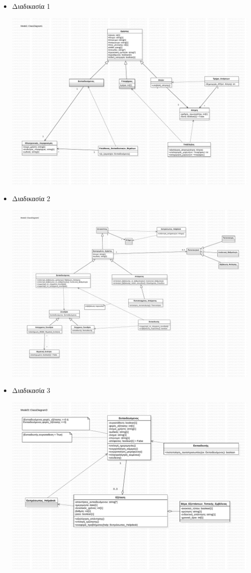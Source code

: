 \documentclass[a4paper, titlepage, twoside]{article}
\begin{document}
\begin{itemize}
\item Διαδικασία 1
\label{sec:orgb01ed71}
\begin{center}
\includegraphics[width=.9\linewidth]{class_1.pdf}
\end{center}
\item Διαδικασία 2
\label{sec:orgb926db2}
\begin{center}
\includegraphics[width=.9\linewidth]{class_2.pdf}
\end{center}
\item Διαδικασία 3
\label{sec:org6dc5efa}
\begin{center}
\includegraphics[width=.9\linewidth]{class_3.pdf}

\end{center}
\end{itemize}
\end{document}
